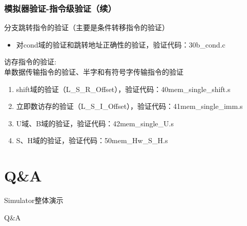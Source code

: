 \documentclass[CJK]{beamer}
\begin{document}
\begin{CJK}{UTF8}{gbsn}
\begin{frame}
	\frametitle{模拟器验证-指令级验证（续）}
	分支跳转指令的验证（主要是条件转移指令的验证）
    \begin{itemize}
    	\item 对cond域的验证和跳转地址正确性的验证，验证代码：30b\_cond.c
    \end{itemize}
    访存指令的验证:\\单数据传输指令的验证、半字和有符号字传输指令的验证
    \begin{enumerate}
    	\item shift域的验证（L\_S\_R\_Offset），验证代码：40mem\_single\_shift.s
    	\item 立即数访存的验证（L\_S\_I\_Offset），验证代码：41mem\_single\_imm.s
    	\item U域、B域的验证，验证代码：42mem\_single\_U.s
    	\item S、H域的验证，验证代码：50mem\_Hw\_S\_H.s
	\end{enumerate}
\end{frame}

\section*{Q\&A}
\begin{frame}
	\huge Simulator整体演示
\end{frame}

\begin{frame}
  \huge Q\&A
\end{frame}


\end{CJK}
\end{document}

